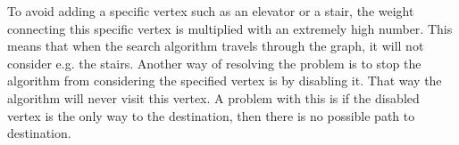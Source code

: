 To avoid adding a specific vertex such as an elevator or a stair, the weight connecting this specific vertex is multiplied with an extremely high number. This means that when the search algorithm travels through the graph, it will not consider e.g. the stairs.
Another way of resolving the problem is to stop the algorithm from considering the specified vertex is by disabling it. That way the algorithm will never visit this vertex. A problem with this is if the disabled vertex is the only way to the destination, then there is no possible path to destination.



